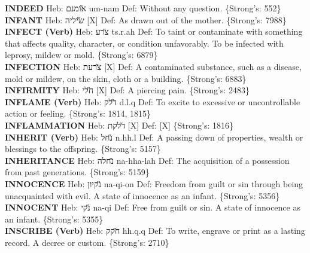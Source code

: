 {\textbf{INDEED} Heb: {\large\H אומנם} um-nam Def: Without any question. \{Strong's: 552\}\hfill{}\\

\textbf{INFANT} Heb: {\large\H שיליה} {[}X{]} Def: As drawn out of the mother. \{Strong's: 7988\}\hfill{}\\

\textbf{INFECT (Verb)} Heb: {\large\H צרע} ts.r.ah Def: To taint or contaminate with something that affects quality, character, or condition unfavorably. To be infected with leprosy, mildew or mold. \{Strong's: 6879\}\hfill{}\\

\textbf{INFECTION} Heb: {\large\H צרעת} {[}X{]} Def: A contaminated substance, such as a disease, mold or mildew, on the skin, cloth or a building. \{Strong's: 6883\}\hfill{}\\

\textbf{INFIRMITY} Heb: {\large\H חלי} {[}X{]} Def: A piercing pain. \{Strong's: 2483\}\hfill{}\\

\textbf{INFLAME (Verb)} Heb: {\large\H דלק} d.l.q Def: To excite to excessive or uncontrollable action or feeling. \{Strong's: 1814, 1815\}\hfill{}\\

\textbf{INFLAMMATION} Heb: {\large\H דלקת} {[}X{]} Def: {[}X{]} \{Strong's: 1816\}\hfill{}\\

\textbf{INHERIT (Verb)} Heb: {\large\H נחל} n.hh.l Def: A passing down of properties, wealth or blessings to the offspring. \{Strong's: 5157\}\hfill{}\\

\textbf{INHERITANCE} Heb: {\large\H נחלה} na-hha-lah Def: The acquisition of a possession from past generations. \{Strong's: 5159\}\hfill{}\\

\textbf{INNOCENCE} Heb: {\large\H נקיון} na-qi-on Def: Freedom from guilt or sin through being unacquainted with evil. A state of innocence as an infant. \{Strong's: 5356\}\hfill{}\\

\textbf{INNOCENT} Heb: {\large\H נקי} na-qi Def: Free from guilt or sin. A state of innocence as an infant. \{Strong's: 5355\}\hfill{}\\

\textbf{INSCRIBE (Verb)} Heb: {\large\H חקק} hh.q.q Def: To write, engrave or print as a lasting record. A decree or custom. \{Strong's: 2710\}\hfill{}\\

}
